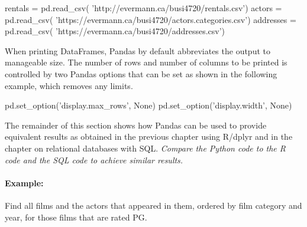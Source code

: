 \begin{samepage}
\begin{pythoncode}
rentals = pd.read_csv(
     'http://evermann.ca/busi4720/rentals.csv')
actors = pd.read_csv(
     'https://evermann.ca/busi4720/actors.categories.csv')
addresses = pd.read_csv(
     'https://evermann.ca/busi4720/addresses.csv')
\end{pythoncode}
\end{samepage}




\noindent When printing DataFrames, Pandas by default abbreviates the output to manageable size. The number of rows and number of columns to be printed is controlled by two Pandas options that can be set as shown in the following example, which removes any limits.

\begin{samepage}
\begin{pythoncode}
pd.set_option('display.max_rows', None)
pd.set_option('display.width', None)
\end{pythoncode}
\end{samepage}

The remainder of this section shows how Pandas can be used to provide equivalent results as obtained in the previous chapter using R/dplyr and in the chapter on relational databases with SQL. \emph{Compare the Python code to the R code and the SQL code to achieve similar results.}

\paragraph*{Example:} Find all films and the actors that appeared in them, ordered by film category and year, for those films that are rated PG.

